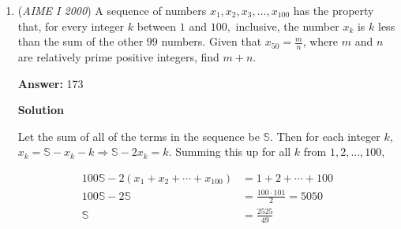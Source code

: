 \begin{enumerate}
 



\textbf{Solution 4}

All logs are base 10 by convention. Rearrange the given statements:

 
 \begin{align*} \log 2000 + \log x + \log y - \log x \log y = 4, \quad \text{which becomes} \quad \log x + \log y = \log x \log y + \log 5. \\ \log 2 + \log y + \log z - \log y \log z = 1, \quad \text{which becomes} \quad \log y + \log z = \log y \log z + \log 5. \\ \log z + \log x - \log z \log x = 0, \quad \text{which becomes} \quad \log x + \log z = \log z \log x. \\ \end{align*}


 Subtract the first two equations to obtain $(\log x - \log z) = \log y (\log x - \log z).$

 This must mean \(\log x = \log z\) because otherwise \(\log y = 1\) turns the first equation into \(\log y = \log 5\) which is self-contradictory.

 With \(\log x = \log z\) we know each value satisfies \(2a = a^2\), so they are both \(0\) or both \(2\). Finally we arrive at our two solutions, where 0 gives us \(0 + \log y = 0 + \log 5\), and \(y = 5\), and 2 gives us \(2 + \log y = 2 \log y + \log 5\), and \(\log y = 2 - \log 5 = \log 20\), so \(y = 20\). Similar to above we arrive at $\boxed{025}$.

 


	\item (\textit{AIME I 2000}) A sequence of numbers $x_{1},x_{2},x_{3},\ldots,x_{100}$ has the property that, for every integer $k$ between $1$ and $100,$ inclusive, the number $x_{k}$ is $k$ less than the sum of the other $99$ numbers. Given that $x_{50} = \frac{m}{n}$, where $m$ and $n$ are relatively prime positive integers, find $m + n$.


 
 \textbf{Answer: }173



\textbf{Solution}

Let the sum of all of the terms in the sequence be $\mathbb{S}$. Then for each integer $k$, $x_k = \mathbb{S}-x_k-k \Longrightarrow \mathbb{S} - 2x_k = k$. Summing this up for all $k$ from $1, 2, \ldots, 100$,

 
 \begin{align*}100\mathbb{S}-2(x_1 + x_2 + \cdots + x_{100}) &= 1 + 2 + \cdots + 100\\ 100\mathbb{S} - 2\mathbb{S} &= \frac{100 \cdot 101}{2} = 5050\\ \mathbb{S}&=\frac{2525}{49}\end{align*}



\end{enumerate}
